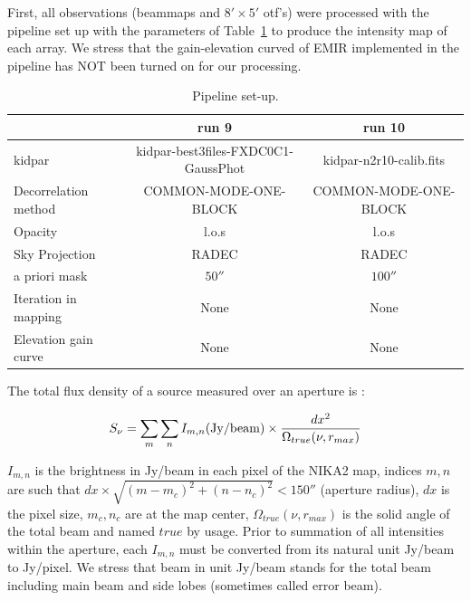 First, all observations (beammaps and $8' \times 5'$ otf's) were processed 
with the pipeline set up with the parameters of Table~\ref{tab:Pipe} to produce the intensity map of each array.
We stress that the  gain-elevation curved of EMIR implemented in the pipeline has NOT been turned on for our processing.

\begin{table}[h]
\centering
\caption[]{Pipeline set-up.}
\begin{tabular}{|l|c|c|}
\hline
                      &    run 9                             &  run  10                   \\
\hline
kidpar                &  {\scriptsize kidpar-best3files-FXDC0C1-GaussPhot} &  {\scriptsize kidpar-n2r10-calib.fits}   \\
Decorrelation method  &  {\scriptsize COMMON-MODE-ONE-BLOCK} &    {\scriptsize COMMON-MODE-ONE-BLOCK}    \\
Opacity               &  {\scriptsize  l.o.s}                &  {\scriptsize l.o.s}     \\
Sky Projection        &  {\scriptsize RADEC}                  &  {\scriptsize RADEC}     \\
a priori mask         &  {\scriptsize   $50''$}              &  {\scriptsize $100''$}  \\
Iteration in mapping  &  {\scriptsize  None}                 &  {\scriptsize None}     \\
Elevation gain curve  &  {\scriptsize  None}                 &  {\scriptsize None}      \\
\hline
\end{tabular}
\label{tab:Pipe}
\end{table}

The total flux density of a source  measured over an aperture  is :

\begin{equation}
S_{\nu} = \sum_{m} \sum_{n}  I_{m,n} ({\rm Jy/beam}) \times {dx^2 \over {\Omega_{true}(\nu, r_{max})}}
\label{eq:ApPh}
\end{equation}

\noindent  $I_{m,n}$ is the brightness in Jy/beam in each pixel of the NIKA2 map, indices
$m,n$ are such that $dx \times \sqrt{(m-m_c)^2 + (n-n_c)^2} < 150''$ (aperture radius), $dx$ is the pixel size,
$m_c,n_c$ are at the map center, $\Omega_{true}(\nu, r_{max})$ is the solid angle of the total beam and named $true$ by usage.
Prior to summation of all intensities within the aperture, each $I_{m,n}$ 
must be converted from its natural unit Jy/beam to Jy/pixel. We stress that beam in unit Jy/beam
stands for the total beam including main beam and side lobes (sometimes called error beam).

